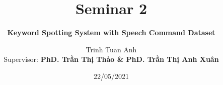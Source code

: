 \title{Seminar 2}
\subtitle{\textbf{Keyword Spotting System with Speech Command Dataset}}

\author{Trinh Tuan Anh\\ \vspace{5pt} {\small Supervisor: \textbf{PhD. Trần Thị Thảo \& PhD. Trần Thị Anh Xuân}}}

\date{22/05/2021}

